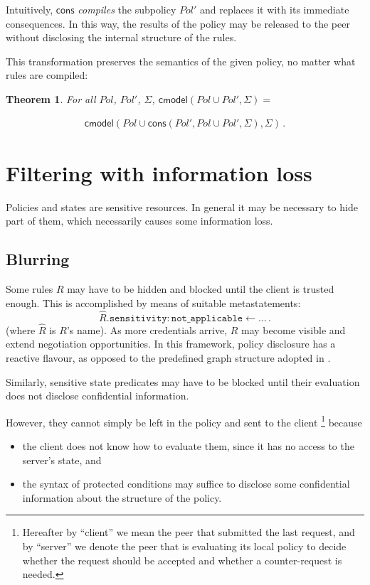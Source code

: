 \documentclass{article}
\newtheorem{theorem}{Theorem}
\newcommand{\m}[1]{\ensuremath{\mathsf{#1}}}
\newcommand{\s}[1]{\ensuremath{\mathtt{#1}}}
\newcommand{\x}[1]{\ensuremath{\mathit{#1}}}
\begin{document}
Intuitively, \m{cons} \emph{compiles} the subpolicy \x{Pol'} and
replaces it with its immediate consequences.  In this way, the results
of the policy may be released to the peer without disclosing the
internal structure of the rules.

This transformation preserves the semantics of the given policy, no
matter what rules are compiled:

\begin{theorem}                                 \label{compile-ok}
For all \x{Pol}, \x{Pol'}, $\Sigma$,
$\m{cmodel} (\x{Pol \cup Pol'},\Sigma) =$
\end{theorem}
\begin{eqnarray*}
    \m{cmodel}(\x{Pol \cup \m{cons}(Pol', Pol \cup Pol',\Sigma)},\Sigma) \,.
\end{eqnarray*}

        \section{Filtering with information loss}
        \label{sec-with-loss}


Policies and states are sensitive resources.  In general it may
be necessary to hide part of them, which necessarily causes some
information loss.

\subsection{Blurring}
\label{sec:blurring}

Some rules $R$ may have to be hidden and blocked until the client is
trusted enough.  This is accomplished by means of suitable
metastatements:
\[
        \hat{R}.\s{sensitivity:not\_applicable} \leftarrow \ldots \,.
\]
(where $\hat{R}$ is $R$'s name).  As more credentials arrive, $R$ may
become visible and extend negotiation opportunities.  In this
framework, policy disclosure has a reactive flavour, as opposed to the
predefined graph structure adopted in \cite{yws01}.

Similarly, sensitive state predicates may have to be blocked until
their evaluation does not disclose confidential information.

However, they cannot simply be left in the policy and sent to the
client%
\footnote{
%
        Hereafter by ``client'' we mean the peer that submitted the
        last request, and by ``server'' we denote the peer that is
        evaluating its local policy to decide whether the request
        should be accepted and whether a counter-request is needed.
%
}
%
because
\begin{itemize}
\item the client does not know how to evaluate them, since it has no
access to the server's state, and
\item the syntax of protected conditions may suffice to disclose some
confidential information about the structure of the policy.
\end{itemize}
\end{document}

